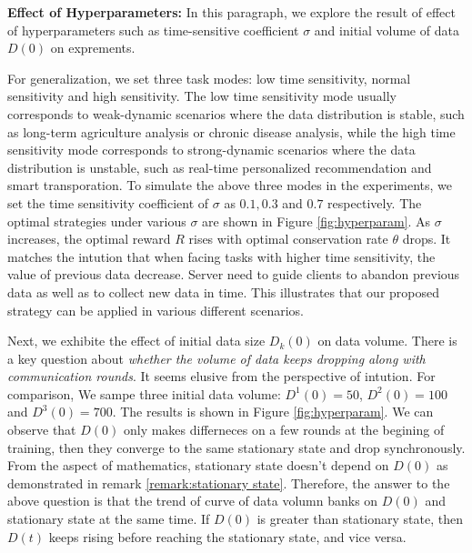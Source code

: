 \documentclass{article}
\theoremstyle{plain}
\theoremstyle{definition}
\theoremstyle{remark}
\begin{document}
\textbf{Effect of Hyperparameters: }
In this paragraph, we explore the result of effect of hyperparameters such as time-sensitive coefficient $\sigma$ and initial volume of data $D(0)$ on exprements.

For generalization, we set three task modes: low time sensitivity, normal sensitivity and high sensitivity.
The low time sensitivity mode usually corresponds to weak-dynamic scenarios where the data distribution is stable, such as long-term agriculture analysis or chronic disease analysis, while the high time sensitivity mode corresponds to strong-dynamic scenarios where the data distribution is unstable, such as real-time personalized recommendation and smart transporation.  
To simulate the above three modes in the experiments, we set the time sensitivity coefficient of $\sigma$ as $0.1, 0.3$ and $0.7$ respectively.
The optimal strategies under various $\sigma$ are shown in Figure \ref{fig:hyperparam}. As $\sigma$ increases, the optimal reward $R$ rises with optimal conservation rate $\theta$ drops.
It matches the intution that when facing tasks with higher time sensitivity, the value of previous data decrease. Server need to guide clients to abandon previous data as well as to collect new data in time.
This illustrates that our proposed strategy can be applied in various different scenarios.

Next, we exhibite the effect of initial data size $D_k(0)$ on data volume.
There is a key question about \textit{whether the volume of data keeps dropping along with communication rounds}. It seems elusive from the perspective of intution.
For comparison, We sampe three initial data volume: $D^1(0)=50$, $D^2(0)=100$ and $D^3(0)=700$. 
The results is shown in Figure \ref{fig:hyperparam}. We can observe that $D(0)$ only makes differneces on a few rounds at the begining of training, then they converge to the same stationary state and drop synchronously.
From the aspect of mathematics, stationary state doesn't depend on $D(0)$ as demonstrated in remark \ref{remark:stationary state}. 
Therefore, the answer to the above question is that the trend of curve of data volumn banks on $D(0)$ and stationary state at the same time.
If $D(0)$ is greater than stationary state, then $D(t)$ keeps rising before reaching the stationary state, and vice versa.
\end{document}
